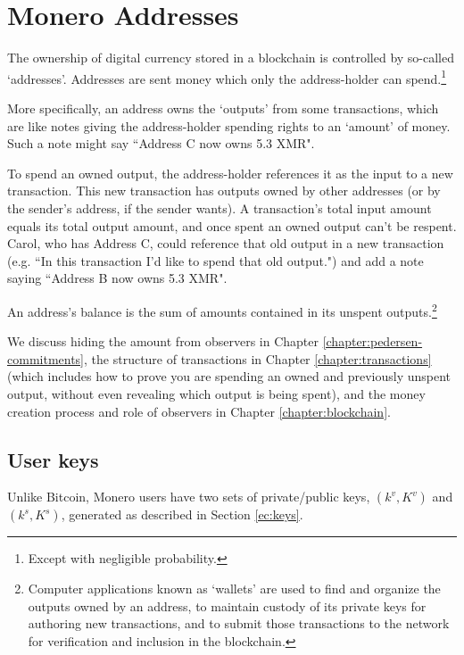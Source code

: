 \chapter{Monero Addresses}
\label{chapter:addresses}

The ownership of digital currency stored in a blockchain is controlled by so-called `addresses'. Addresses are sent money which only the address-holder can spend.\footnote{Except with negligible probability.}

More specifically, an address owns the `outputs' from some transactions, which are like notes giving the address-holder spending rights to an `amount' of money. Such a note might say ``Address C now owns 5.3 XMR".

To spend an owned output, the address-holder references it as the input to a new transaction. This new transaction has outputs owned by other addresses (or by the sender's address, if the sender wants). A transaction's total input amount equals its total output amount, and once spent an owned output can't be respent. Carol, who has Address C, could reference that old output in a new transaction (e.g. ``In this transaction I'd like to spend that old output.") and add a note saying ``Address B now owns 5.3 XMR".

An address's balance is the sum of amounts contained in its unspent outputs.\footnote{Computer applications known as `wallets' are used to find and organize the outputs owned by an address, to maintain custody of its private keys for authoring new transactions, and to submit those transactions to the network for verification and inclusion in the blockchain.}

We discuss hiding the amount from observers in Chapter \ref{chapter:pedersen-commitments}, the structure of transactions in Chapter \ref{chapter:transactions} (which includes how to prove you are spending an owned and previously unspent output, without even revealing which output is being spent), and the money creation process and role of observers in Chapter \ref{chapter:blockchain}.



\section{User keys}
\label{sec:user-keys}

Unlike Bitcoin, Monero users have two sets of private/public keys, \((k^v, K^v)\) and \( (k^s, K^s) \), generated as described in Section \ref{ec:keys}.

